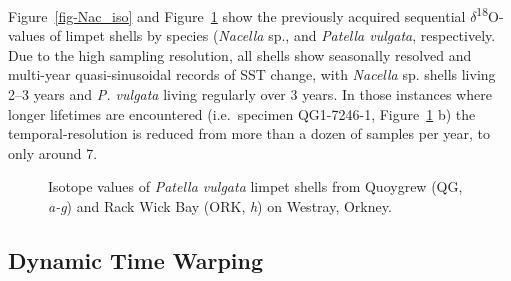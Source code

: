 \documentclass[
  authoryear,
  preprint,
  3p]{elsarticle}
\begin{document}
Figure~\ref{fig-Nac_iso} and Figure~\ref{fig-Pat_iso} show the
previously acquired sequential \(\delta\)\textsuperscript{18}O-values of
limpet shells by species (\emph{Nacella} sp., and \emph{Patella
vulgata}, respectively. Due to the high sampling resolution, all shells
show seasonally resolved and multi-year quasi-sinusoidal records of SST
change, with \emph{Nacella} sp. shells living 2--3 years and \emph{P.
vulgata} living regularly over 3 years. In those instances where longer
lifetimes are encountered (i.e.~specimen QG1-7246-1,
Figure~\ref{fig-Pat_iso} b) the temporal-resolution is reduced from more
than a dozen of samples per year, to only around 7.

\begin{figure}[H]


\caption{\label{fig-Pat_iso}Isotope values of \emph{Patella vulgata}
limpet shells from Quoygrew (QG, \emph{a-g}) and Rack Wick Bay (ORK,
\emph{h}) on Westray, Orkney.}

\end{figure}%

\subsection{Dynamic Time Warping}\label{dynamic-time-warping}
\end{document}
